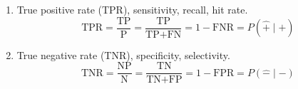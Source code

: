 \begin{enumerate}[noitemsep]
\item True positive rate (TPR), \ie sensitivity, recall, hit rate.
\begin{equation} \label{eq:TPR}
\text{TPR} = \frac{\text{TP}}{\text{P}} = \frac{\text{TP}}{\text{TP}+\text{FN}} = 1 - \text{FNR} = P\left(\hat{+} \mid + \right)
\end{equation}

\item True negative rate (TNR), \ie specificity, selectivity.
\begin{equation} \label{eq:TPR}
\text{TNR} = \frac{\text{NP}}{\text{N}} = \frac{\text{TN}}{\text{TN}+\text{FP}} = 1 - \text{FPR} = P\left(\hat{-} \mid - \right)
\end{equation}
\end{enumerate}



